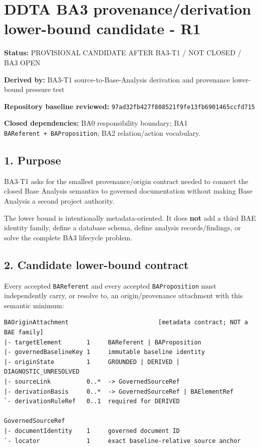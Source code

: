 \documentclass[11pt,a4paper]{article}
\begin{document}
\section{DDTA BA3 provenance/derivation lower-bound candidate - R1}\label{ddta-ba3-provenancederivation-lower-bound-candidate---r1}

\textbf{Status:} PROVISIONAL CANDIDATE AFTER BA3-T1 / NOT CLOSED / BA3 OPEN

\textbf{Derived by:} BA3-T1 source-to-Base-Analysis derivation and provenance lower-bound pressure test

\textbf{Repository baseline reviewed:} \texttt{97ad32fb427f808521f9fe13fb6901465ccfd715}

\textbf{Closed dependencies:} BA0 responsibility boundary; BA1 \texttt{BAReferent\ +\ BAProposition}; BA2 relation/action vocabulary.

\subsection{1. Purpose}\label{1-purpose}

BA3-T1 asks for the smallest provenance/origin contract needed to connect the closed Base Analysis semantics to governed documentation without making Base Analysis a second project authority.

The lower bound is intentionally metadata-oriented. It does \textbf{not} add a third BAE identity family, define a database schema, define analysis records/findings, or solve the complete BA3 lifecycle problem.

\subsection{2. Candidate lower-bound contract}\label{2-candidate-lower-bound-contract}

Every accepted \texttt{BAReferent} and every accepted \texttt{BAProposition} must independently carry, or resolve to, an origin/provenance attachment with this semantic minimum:

\begin{verbatim}
BAOriginAttachment                         [metadata contract; NOT a BAE family]
|- targetElement       1     BAReferent | BAProposition
|- governedBaselineKey 1     immutable baseline identity
|- originState         1     GROUNDED | DERIVED | DIAGNOSTIC_UNRESOLVED
|- sourceLink          0..*  -> GovernedSourceRef
|- derivationBasis     0..*  -> GovernedSourceRef | BAElementRef
`- derivationRuleRef   0..1  required for DERIVED

GovernedSourceRef
|- documentIdentity    1     governed document ID
`- locator             1     exact baseline-relative source anchor
\end{verbatim}
\end{document}
